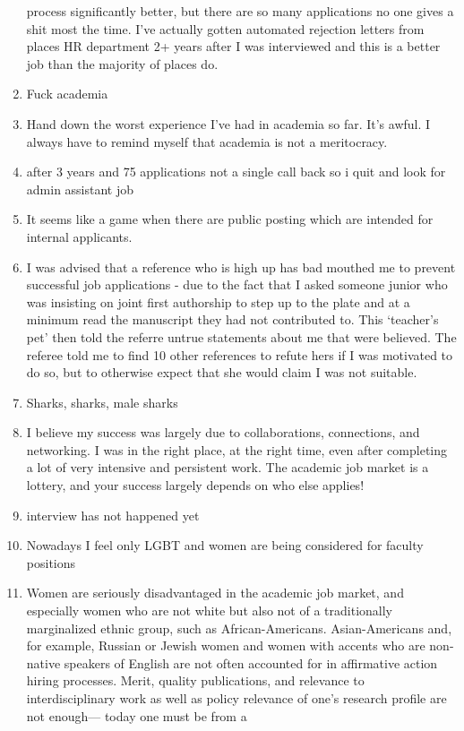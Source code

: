 \documentclass[]{article}
\begin{document}
\begin{enumerate}
  process significantly better, but there are so many applications no
  one gives a shit most the time. I've actually gotten automated
  rejection letters from places HR department 2+ years after I was
  interviewed and this is a better job than the majority of places do.
\item
  Fuck academia
\item
  Hand down the worst experience I've had in academia so far. It's
  awful. I always have to remind myself that academia is not a
  meritocracy.
\item
  after 3 years and 75 applications not a single call back so i quit and
  look for admin assistant job
\item
  It seems like a game when there are public posting which are intended
  for internal applicants.
\item
  \textbar{}I was advised that a reference who is high up has bad
  mouthed me to prevent successful job applications - due to the fact
  that I asked someone junior who was insisting on joint first
  authorship to step up to the plate and at a minimum read the
  manuscript they had not contributed to. This `teacher's pet' then told
  the referre untrue statements about me that were believed. The referee
  told me to find 10 other references to refute hers if I was motivated
  to do so, but to otherwise expect that she would claim I was not
  suitable.
\item
  Sharks, sharks, male sharks
\item
  I believe my success was largely due to collaborations, connections,
  and networking. I was in the right place, at the right time, even
  after completing a lot of very intensive and persistent work. The
  academic job market is a lottery, and your success largely depends on
  who else applies!
\item
  interview has not happened yet
\item
  Nowadays I feel only LGBT and women are being considered for faculty
  positions
\item
  Women are seriously disadvantaged in the academic job market, and
  especially women who are not white but also not of a traditionally
  marginalized ethnic group, such as African-Americans. Asian-Americans
  and, for example, Russian or Jewish women and women with accents who
  are non-native speakers of English are not often accounted for in
  affirmative action hiring processes. Merit, quality publications, and
  relevance to interdisciplinary work as well as policy relevance of
  one's research profile are not enough--- today one must be from a

\end{enumerate}
\end{document}
